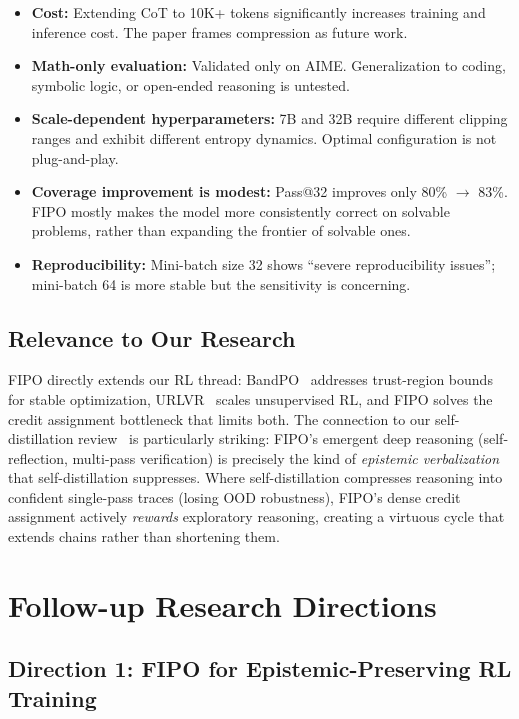 \documentclass[11pt]{article}
\begin{document}
\begin{itemize}
    \item \textbf{Cost:} Extending CoT to 10K+ tokens significantly increases training and inference cost. The paper frames compression as future work.
    \item \textbf{Math-only evaluation:} Validated only on AIME. Generalization to coding, symbolic logic, or open-ended reasoning is untested.
    \item \textbf{Scale-dependent hyperparameters:} 7B and 32B require different clipping ranges and exhibit different entropy dynamics. Optimal configuration is not plug-and-play.
    \item \textbf{Coverage improvement is modest:} Pass@32 improves only 80\% $\to$ 83\%. FIPO mostly makes the model more consistently correct on solvable problems, rather than expanding the frontier of solvable ones.
    \item \textbf{Reproducibility:} Mini-batch size 32 shows ``severe reproducibility issues''; mini-batch 64 is more stable but the sensitivity is concerning.
\end{itemize}

\subsection{Relevance to Our Research}

FIPO directly extends our RL thread: BandPO~\cite{bandpo} addresses trust-region bounds for stable optimization, URLVR~\cite{urlvr} scales unsupervised RL, and FIPO solves the credit assignment bottleneck that limits both. The connection to our self-distillation review~\cite{selfdistill} is particularly striking: FIPO's emergent deep reasoning (self-reflection, multi-pass verification) is precisely the kind of \textit{epistemic verbalization} that self-distillation suppresses. Where self-distillation compresses reasoning into confident single-pass traces (losing OOD robustness), FIPO's dense credit assignment actively \textit{rewards} exploratory reasoning, creating a virtuous cycle that extends chains rather than shortening them.

\section{Follow-up Research Directions}

\subsection{Direction 1: FIPO for Epistemic-Preserving RL Training}
\end{document}
